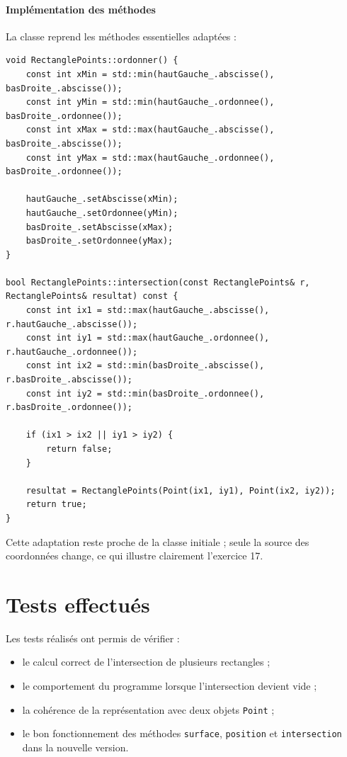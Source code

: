 \documentclass[12pt,a4paper]{article}
\begin{document}
\paragraph{Impl\'ementation des m\'ethodes} La classe reprend les m\'ethodes essentielles adaptées :
\begin{lstlisting}[style=cppstyle]
void RectanglePoints::ordonner() {
    const int xMin = std::min(hautGauche_.abscisse(), basDroite_.abscisse());
    const int yMin = std::min(hautGauche_.ordonnee(), basDroite_.ordonnee());
    const int xMax = std::max(hautGauche_.abscisse(), basDroite_.abscisse());
    const int yMax = std::max(hautGauche_.ordonnee(), basDroite_.ordonnee());

    hautGauche_.setAbscisse(xMin);
    hautGauche_.setOrdonnee(yMin);
    basDroite_.setAbscisse(xMax);
    basDroite_.setOrdonnee(yMax);
}

bool RectanglePoints::intersection(const RectanglePoints& r, RectanglePoints& resultat) const {
    const int ix1 = std::max(hautGauche_.abscisse(), r.hautGauche_.abscisse());
    const int iy1 = std::max(hautGauche_.ordonnee(), r.hautGauche_.ordonnee());
    const int ix2 = std::min(basDroite_.abscisse(), r.basDroite_.abscisse());
    const int iy2 = std::min(basDroite_.ordonnee(), r.basDroite_.ordonnee());

    if (ix1 > ix2 || iy1 > iy2) {
        return false;
    }

    resultat = RectanglePoints(Point(ix1, iy1), Point(ix2, iy2));
    return true;
}
\end{lstlisting}
Cette adaptation reste proche de la classe initiale ; seule la source des coordonn\'ees change, ce qui illustre clairement l'exercice 17.

\section{Tests effectu\'es}
Les tests r\'ealis\'es ont permis de v\'erifier :
\begin{itemize}[leftmargin=*]
    \item le calcul correct de l'intersection de plusieurs rectangles ;
    \item le comportement du programme lorsque l'intersection devient vide ;
    \item la coh\'erence de la repr\'esentation avec deux objets \texttt{Point} ;
    \item le bon fonctionnement des m\'ethodes \texttt{surface}, \texttt{position} et \texttt{intersection} dans la nouvelle version.
\end{itemize}
\end{document}
